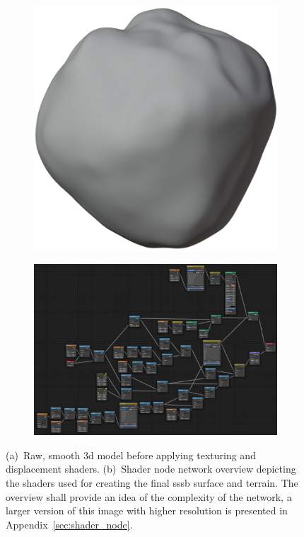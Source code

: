 \begin{figure}[htb]
    \centering
    \begin{subfigure}[b]{0.48\textwidth}
        \centering
        \includegraphics[width=.7\textwidth]{doc/thesis/0_figures/procedural_terrain/smooth_model.png}
        \caption{}
        \label{fig:smooth_model}
    \end{subfigure}
    \begin{subfigure}[b]{0.48\textwidth}
        \centering
        \includegraphics[width=\textwidth]{doc/thesis/0_figures/procedural_terrain/node_network.png}
        \caption{}
        \label{fig:shader_nodes}
    \end{subfigure}
    \caption{(a)~Raw, smooth \gls{3d} model before applying texturing and displacement shaders. (b)~Shader node network overview depicting the shaders used for creating the final \gls{sssb} surface and terrain. The overview shall provide an idea of the complexity of the network, a larger version of this image with higher resolution is presented in Appendix~\ref{sec:shader_node}.}
\end{figure}

